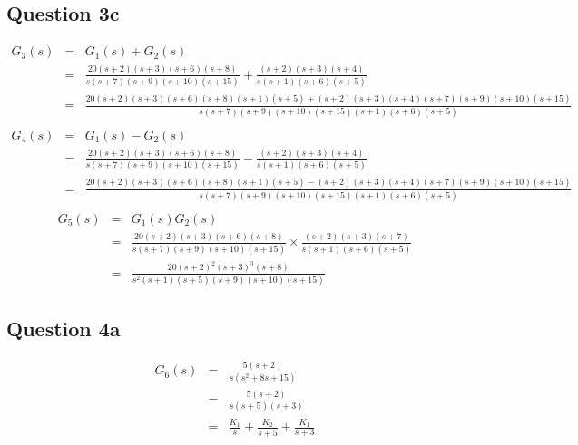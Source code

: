\documentclass[12pt, a4paper]{article}
\begin{document}
		\subsection*{Question 3c}
		\label{sub:question_3c}
		\begin{equation*}
			\begin{array}{rcl}
				G_3(s) & = & G_1(s)+G_2(s)\\
				& = & \frac{20(s+2)(s+3)(s+6)(s+8)}{s(s+7)(s+9)(s+10)(s+15)} + \frac{(s+2)(s+3)(s+4)}{s(s+1)(s+6)(s+5)}\\
				& = & \frac{20(s+2)(s+3)(s+6)(s+8)(s+1)(s+5)+(s+2)(s+3)(s+4)(s+7)(s+9)(s+10)(s+15)}{s(s+7)(s+9)(s+10)(s+15)(s+1)(s+6)(s+5)}\\
			\end{array}
		\end{equation*}
		\begin{equation*}
			\begin{array}{rcl}
				G_4(s) & = & G_1(s)-G_2(s)\\
				& = & \frac{20(s+2)(s+3)(s+6)(s+8)}{s(s+7)(s+9)(s+10)(s+15)} - \frac{(s+2)(s+3)(s+4)}{s(s+1)(s+6)(s+5)}\\
				& = & \frac{20(s+2)(s+3)(s+6)(s+8)(s+1)(s+5)-(s+2)(s+3)(s+4)(s+7)(s+9)(s+10)(s+15)}{s(s+7)(s+9)(s+10)(s+15)(s+1)(s+6)(s+5)}\\
			\end{array}
		\end{equation*}
		\begin{equation*}
			\begin{array}{rcl}
				G_5(s) & = & G_1(s)G_2(s)\\
				& = & \frac{20(s+2)(s+3)(s+6)(s+8)}{s(s+7)(s+9)(s+10)(s+15)}{} \times \frac{(s+2)(s+3)(s+7)}{s(s+1)(s+6)(s+5)}\\
				& = & \frac{20(s+2)^2(s+3)^3(s+8)}{s^2(s+1)(s+5)(s+9)(s+10)(s+15)}
			\end{array}
		\end{equation*}

	\subsection*{Question 4a}
		\label{sub:question_4a}
		\begin{equation*}
			\begin{array}{rcl}
				G_6(s) & = & \frac{5(s+2)}{s(s^2+8s+15)}\\
				& = & \frac{5(s+2)}{s(s+5)(s+3)}\\
				& = & \frac{K_1}{s} + \frac{K_2}{s+5} + \frac{K_1}{s+3}
			\end{array}
		\end{equation*}
\end{document}
